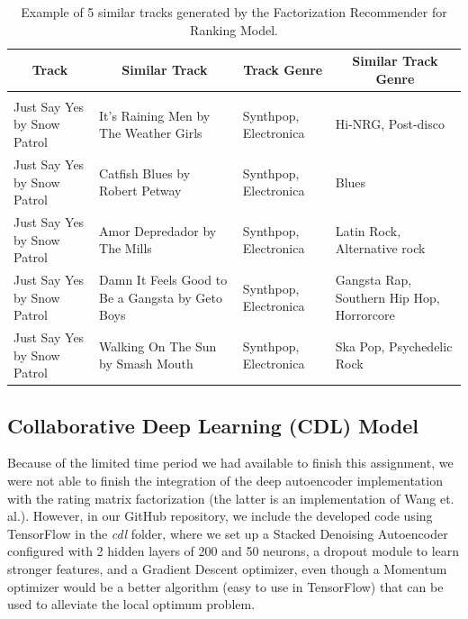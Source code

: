 \documentclass{article} %
\begin{document}
\begin{table}[!htbp]
\caption{Example of 5 similar tracks generated by the Factorization Recommender for Ranking Model.}
\label{table:12}
\begin{center}
\begin{tabular}{p{2.2cm} p{3.6cm} p{3.2cm} p{3.3cm}}
\multicolumn{1}{c}{\bf Track} & \multicolumn{1}{c}{\bf Similar Track} & \multicolumn{1}{c}{\bf Track Genre} & \multicolumn{1}{c}{\bf Similar Track Genre}
\\ \hline \\

Just Say Yes by Snow Patrol & It's Raining Men by The Weather Girls & Synthpop, Electronica & Hi-NRG, Post-disco\\
Just Say Yes by Snow Patrol & Catfish Blues by Robert Petway & Synthpop, Electronica & Blues\\
Just Say Yes by Snow Patrol & Amor Depredador by The Mills & Synthpop, Electronica & Latin Rock, Alternative rock\\
Just Say Yes by Snow Patrol & Damn It Feels Good to Be a Gangsta by Geto Boys & Synthpop, Electronica & Gangsta Rap, Southern Hip Hop, Horrorcore\\
Just Say Yes by Snow Patrol & Walking On The Sun by Smash Mouth & Synthpop, Electronica & Ska Pop, Psychedelic Rock\\

\end{tabular}
\end{center}
\end{table}

\subsection{Collaborative Deep Learning (CDL) Model}

Because of the limited time period we had available to finish this assignment, we were not able to finish the integration of the deep autoencoder implementation with the rating matrix factorization (the latter is an implementation of Wang et. al.\cite{wang2015collaborative}). However, in our GitHub repository, we include the developed code using TensorFlow in the \textit{cdl} folder, where we set up a Stacked Denoising Autoencoder configured with 2 hidden layers of 200 and 50 neurons, a dropout module to learn stronger features, and a Gradient Descent optimizer, even though a Momentum optimizer would be a better algorithm (easy to use in TensorFlow) that can be used to alleviate the local optimum problem.
\end{document}
